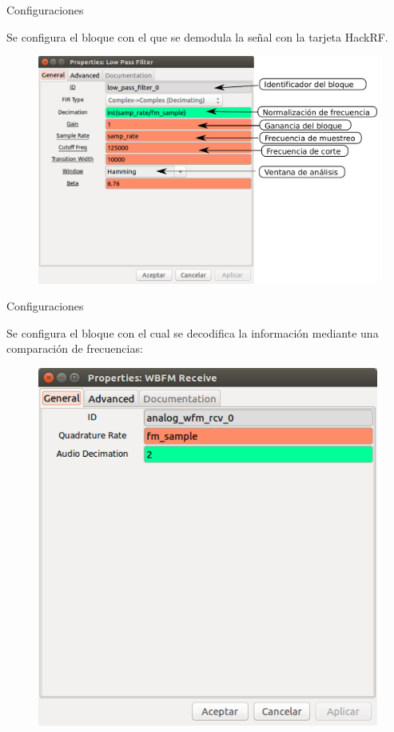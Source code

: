\begin{frame}{Configuraciones}

Se configura el bloque con el que se demodula la señal con la tarjeta HackRF.

\begin{figure}[H]
\centering
\vspace{-3mm}
\includegraphics[width=.8\textwidth]{parte3/lab10/pdf/lab10_9.pdf}
\end{figure}

\end{frame}

\begin{frame}{Configuraciones}

Se configura el bloque con el cual se decodifica la información mediante una comparación de frecuencias:

\begin{figure}[H]
\centering
\vspace{-3mm}
\includegraphics[width=.5\textwidth]{parte3/lab10/pdf/lab10_10.pdf}
\end{figure}

\end{frame}


